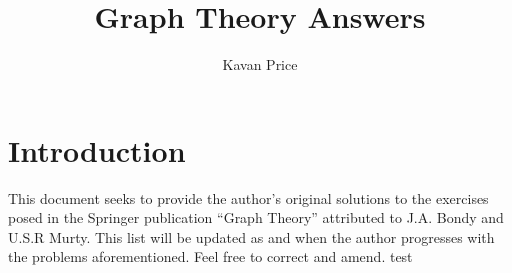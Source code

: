 \documentclass[11pt,a4paper,twoside]{article}
\title{\textbf{Graph Theory Answers}}
\author{Kavan Price}
\date{}
\begin{document}
\maketitle

\section*{Introduction}
This document seeks to provide the author's original solutions to the exercises posed in the Springer publication ``Graph Theory'' attributed to J.A. Bondy and U.S.R Murty. This list will be updated as and when the author progresses with the problems aforementioned. Feel free to correct and amend.
\newpage
test
\end{document}
